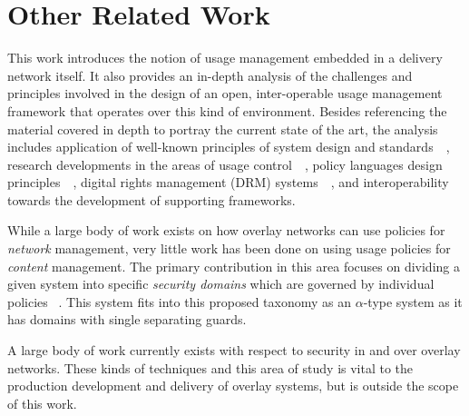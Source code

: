 \section{Other Related Work}
This work introduces the notion of usage management embedded in a delivery network itself.  It also provides an in-depth analysis of the challenges and principles involved in the design of an open, inter-operable usage management framework that operates over this kind of environment. Besides referencing the material covered in depth to portray the current state of the art, the analysis includes application of well-known principles of system design and standards~~\cite{Blumenthal:2001:RDI:383034.383037,Clark:1995:DPD:205447.205458,ClWrSoBr:02}, research developments in the areas of usage control~~\cite{PaSa:04,JaHeLa:10}, policy languages design principles~~\cite{JaHeMa:06}, digital rights management (DRM) systems~~\cite{JaHe:09},  and interoperability~~\cite{JaHe:04,HeJa:05,KoLaMaMi:04,coral,marlin} towards the development of supporting frameworks.

While a large body of work exists on how overlay networks can use policies for \textit{network} management, very little work has been done on using usage policies for \textit{content} management.  The primary contribution in this area focuses on dividing a given system into specific \textit{security domains} which are governed by individual policies ~\cite{4457175}.  This system fits into this proposed taxonomy as an $\alpha$-type system as it has domains with single separating guards.

A large body of work currently exists with respect to security in and over overlay networks.  These kinds of techniques and this area of study is vital to the production development and delivery of overlay systems, but is outside the scope of this work.